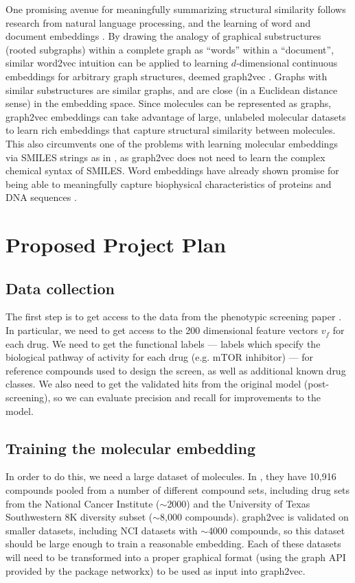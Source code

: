 \documentclass{article}
\begin{document}
One promising avenue for meaningfully summarizing structural similarity follows research from natural language processing, and the learning of word and document embeddings \cite{Goldberg2014}. By drawing the analogy of graphical substructures (rooted subgraphs) within a complete graph as ``words'' within a ``document'', similar word2vec intuition can be applied to learning $d$-dimensional continuous embeddings for arbitrary graph structures, deemed graph2vec \cite{Narayanan}. Graphs with similar substructures are similar graphs, and are close (in a Euclidean distance sense) in the embedding space. Since molecules can be represented as graphs, graph2vec embeddings can take advantage of large, unlabeled molecular datasets to learn rich embeddings that capture structural similarity between molecules. This also circumvents one of the problems with learning molecular embeddings via SMILES strings as in \cite{Gomez-Bombarelli2018}, as graph2vec does not need to learn the complex chemical syntax of SMILES. Word embeddings have already shown promise for being able to meaningfully capture biophysical characteristics of proteins and DNA sequences \cite{Hamid2018} \cite{Asgari2015}.

\section{Proposed Project Plan}

\subsection{Data collection}

The first step is to get access to the data from the phenotypic screening paper \cite{Kang2016}. In particular, we need to get access to the 200 dimensional feature vectors $v_f$ for each drug. We need to get the functional labels --- labels which specify the biological pathway of activity for each drug (e.g. mTOR inhibitor) --- for reference compounds used to design the screen, as well as additional known drug classes. We also need to get the validated hits from the original model (post-screening), so we can evaluate precision and recall for improvements to the model.

\subsection{Training the molecular embedding}

In order to do this, we need a large dataset of molecules. In \cite{Kang2016}, they have 10,916 compounds pooled from a number of different compound sets, including drug sets from the National Cancer Institute ($\sim$2000) and the University of Texas Southwestern 8K diversity subset ($\sim$8,000 compounds). graph2vec \cite{Narayanan} is validated on smaller datasets, including NCI datasets with $\sim$4000 compounds, so this dataset should be large enough to train a reasonable embedding. Each of these datasets will need to be transformed into a proper graphical format (using the graph API provided by the package networkx) to be used as input into graph2vec.
\end{document}
